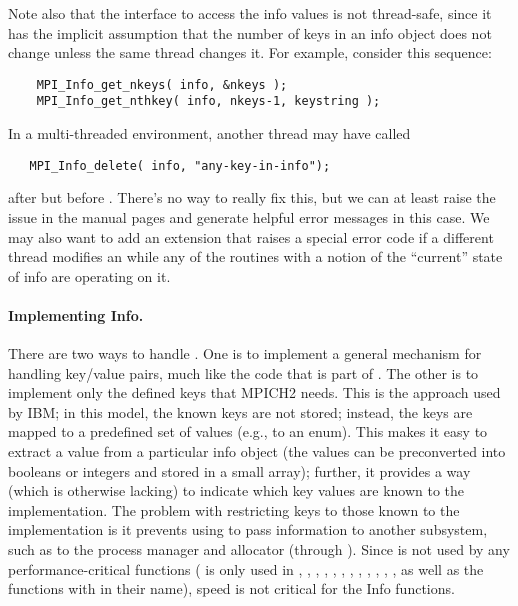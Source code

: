 \documentclass{article}
\begin{document}
Note also that the interface to access the info values is not
thread-safe, since it has the implicit assumption that the number of
keys in an info object does not change unless the same thread changes it.
For example, consider this sequence:
\begin{verbatim}
    MPI_Info_get_nkeys( info, &nkeys );
    MPI_Info_get_nthkey( info, nkeys-1, keystring );
\end{verbatim}
In a multi-threaded environment, another thread may have called
\begin{verbatim}
   MPI_Info_delete( info, "any-key-in-info");
\end{verbatim}
after  but before
.  There's no way to really fix this, but
we can at least raise the issue in the manual pages and generate
helpful error messages in this case.  We may also want to add an
extension that raises a special error code if a different thread
modifies an  while any of the routines with a notion of
the ``current'' state of info are operating on it.

\paragraph{Implementing Info.}
There are two ways to handle .  One is to implement a general
mechanism for handling key/value pairs, much like the code that is part of
.  The other is to implement only the defined keys that
MPICH2 needs.  This is the approach used by IBM; in this model, the known keys
are not stored; instead, the keys are mapped to a predefined set of values
(e.g., to an enum).  This makes it easy to extract a value from a particular
info object (the values can be preconverted into booleans or integers and
stored in a small array); further, it provides a way (which is otherwise
lacking) to 
indicate which key values are known to the implementation.  
The problem with restricting keys to those known to the implementation is it
prevents using  to pass information to another subsystem, such
as to the process manager and allocator (through ). 
Since  is not used by any performance-critical functions
( is only used in , ,
, 
, , ,
, , ,
, , 
, as well as the functions with  in their
name), speed is not critical for the Info functions.
\end{document}
